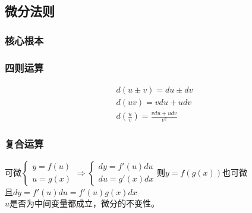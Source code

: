 \subsection{微分法则}
\subsubsection{核心根本}
\begin{figure}[htp]
    \centering
\end{figure}
\subsubsection{四则运算}
\begin{align}
    d\left(u\pm v\right)=du\pm dv\label{differential_operation_rule_1}\\
    d(uv)=vdu+udv \label{differential_operation_rule_2}\\
    d\left(\frac{u}{v}\right)=\frac{vdu+udv}{v^2} \label{differential_operation_rule_3}
\end{align}
\subsubsection{复合运算}
\begin{center}
    可微$\begin{cases}
        y=f(u)\\
        u=g(x)
    \end{cases}\Rightarrow \begin{cases}
        dy=f'(u)du\\
        du=g'(x)dx
    \end{cases}$则$y=f(g(x))$也可微\\
    且$  dy=f'(u)du=f'(u)g(x)dx$\\
    $u$是否为中间变量都成立，微分的不变性。
\end{center}
